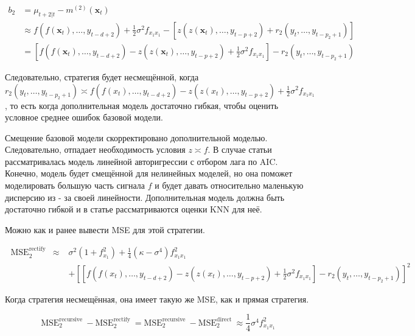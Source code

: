 \documentclass[a4paper,12pt]{article}
\begin{document}
\[ \begin{aligned} b_{2} &=\mu_{t+2 | t}-m^{(2)}\left(\boldsymbol{x}_{t}\right) \\ & \approx f\left(f\left(\boldsymbol{x}_{t}\right), \ldots, y_{t-d+2}\right)+\frac{1}{2} \sigma^{2} f_{x_{1} x_{1}}-\left[z\left(z\left(\boldsymbol{x}_{t}\right), \ldots, y_{t-p+2}\right)+r_{2}\left(y_{t}, \ldots, y_{t-p_{2}+1}\right)\right] \\ &=\left[f\left(f\left(\boldsymbol{x}_{t}\right), \ldots, y_{t-d+2}\right)-z\left(z\left(\boldsymbol{x}_{t}\right), \ldots, y_{t-p+2}\right)+\frac{1}{2} \sigma^{2} f_{x_{1} x_{1}}\right]-r_{2}\left(y_{t}, \ldots, y_{t-p_{2}+1}\right) \end{aligned} \]

Следовательно, стратегия будет несмещённой, когда $ r_{2}\left(y_{t}, \ldots, y_{t-p_{2}+1}\right) \asymp f\left(f\left(x_{t}\right), \ldots, y_{t-d+2}\right)-z\left(z\left(x_{t}\right), \ldots, y_{t-p+2}\right)+\frac{1}{2} \sigma^{2} f_{x_{1} x_{1}} $, то есть когда дополнительная модель достаточно гибкая, чтобы оценить условное среднее ошибок базовой модели.

Смещение базовой модели скорректировано дополнительной моделью. Следовательно, отпадает необходимость условия $ z \asymp f $. В случае статьи рассматривалась модель линейной авторигрессии с отбором лага по AIC. Конечно, модель будет смещённой  для нелинейных моделей, но она поможет моделировать большую часть сигнала $ f $ и будет давать относительно маленькую дисперсию из - за своей линейности. Дополнительная модель должна быть достаточно гибкой и в статье рассматриваются оценки KNN для неё.

Можно как и ранее вывести MSE для этой стратегии.

\[
\begin{aligned} \operatorname{MSE}_{2}^{\text {rectify }} \approx & \sigma^{2}\left(1+f_{x_{1}}^{2}\right)+\frac{1}{4}\left(\kappa-\sigma^{4}\right) f_{x_{1} x_{1}}^{2} \\ &+\left[\left[f\left(f\left(x_{t}\right), \ldots, y_{t-d+2}\right)-z\left(z\left(x_{t}\right), \ldots, y_{t-p+2}\right)+\frac{1}{2} \sigma^{2} f_{x_{1} x_{1}}\right]-r_{2}\left(y_{t}, \ldots, y_{t-p_{2}+1}\right)\right]^{2} \end{aligned}
\]

Когда стратегия несмещённая, она имеет такую же MSE, как и прямая стратегия.

\[
\mathrm{MSE}_{2}^{\text {recursive }}-\mathrm{MSE}_{2}^{\text {rectify }}=\mathrm{MSE}_{2}^{\text {recursive }}-\mathrm{MSE}_{2}^{\text {direct }} \approx \frac{1}{4} \sigma^{4} f_{x_{1} x_{1}}^{2}
\]
\end{document}
